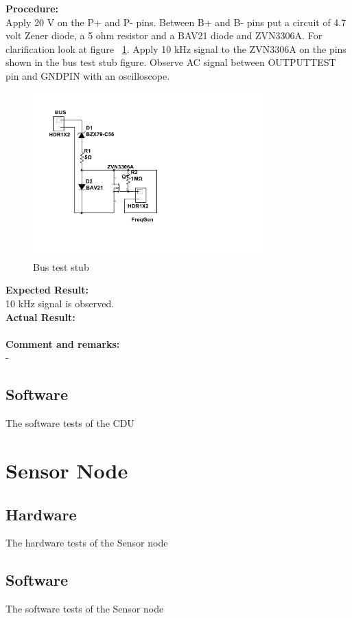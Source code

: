 \textbf{Procedure:}\\
Apply 20 V on the P+ and P- pins. Between B+ and B- pins put a circuit of 4.7 volt Zener diode, a 5 ohm resistor and a BAV21 diode and ZVN3306A. For clarification look at figure ~\ref{fig:busteststub}. Apply 10 kHz signal to the ZVN3306A on the pins shown in the bus test stub figure. Observe AC signal between OUTPUTTEST pin and GNDPIN with an oscilloscope.\\
\begin{figure}[H]
\centering
\includegraphics[width=0.8\textwidth]{billeder/BusTestStub}
\caption{Bus test stub}
\label{fig:busteststub}
\end{figure} 


\textbf{Expected Result:}\\
10 kHz signal is observed.\\

\textbf{Actual Result:}\\
\\

\textbf{Comment and remarks:}\\
-\\

\subsection{Software}
The software tests of the CDU

\section{Sensor Node}
\subsection{Hardware}
The hardware tests of the Sensor node
\subsection{Software}
The software tests of the Sensor node